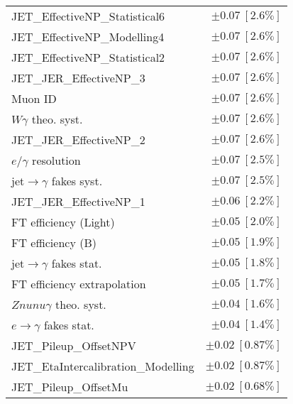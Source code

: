 \begin{tabular}{lr}
JET\_EffectiveNP\_Statistical6 & $\pm 0.07\ [2.6\%]$ \\
JET\_EffectiveNP\_Modelling4 & $\pm 0.07\ [2.6\%]$ \\
JET\_EffectiveNP\_Statistical2 & $\pm 0.07\ [2.6\%]$ \\
JET\_JER\_EffectiveNP\_3 & $\pm 0.07\ [2.6\%]$ \\
Muon ID & $\pm 0.07\ [2.6\%]$ \\
$W\gamma$ theo. syst. & $\pm 0.07\ [2.6\%]$ \\
JET\_JER\_EffectiveNP\_2 & $\pm 0.07\ [2.6\%]$ \\
$e/\gamma$ resolution & $\pm 0.07\ [2.5\%]$ \\
jet$\to\gamma$ fakes syst. & $\pm 0.07\ [2.5\%]$ \\
JET\_JER\_EffectiveNP\_1 & $\pm 0.06\ [2.2\%]$ \\
FT efficiency (Light) & $\pm 0.05\ [2.0\%]$ \\
FT efficiency (B) & $\pm 0.05\ [1.9\%]$ \\
jet$\to\gamma$ fakes stat. & $\pm 0.05\ [1.8\%]$ \\
FT efficiency extrapolation & $\pm 0.05\ [1.7\%]$ \\
$Znunu\gamma$ theo. syst. & $\pm 0.04\ [1.6\%]$ \\
$e\to\gamma$ fakes stat. & $\pm 0.04\ [1.4\%]$ \\
JET\_Pileup\_OffsetNPV & $\pm 0.02\ [0.87\%]$ \\
JET\_EtaIntercalibration\_Modelling & $\pm 0.02\ [0.87\%]$ \\
JET\_Pileup\_OffsetMu & $\pm 0.02\ [0.68\%]$ \\
\hline
\end{tabular}

